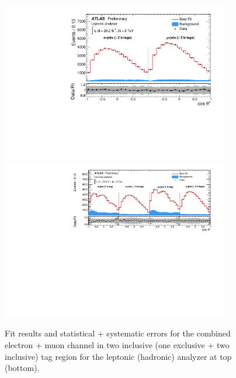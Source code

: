 \begin{figure}[!ht]
\begin{center}

		\includegraphics[height=70mm]{chapters/whel/figures/results/Datafit_StatUnc_el_mu_lep2incl}
		\includegraphics[height=70mm]{chapters/whel/figures/results/bTag_1excl2incl/Datafit_StatUnc_el_mu_bTag_had}
	\caption{Fit results and statistical + systematic errors for the combined electron + muon channel in two inclusive (one exclusive + two inclusive) \bt tag region for the leptonic (hadronic) analyzer at top (bottom).}
	\label{fig:cosThetaFits_lep_2incl_had_bTag}
\end{center}
\end{figure}


